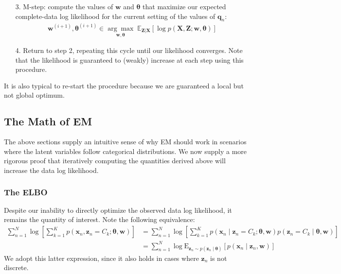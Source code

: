 \begin{itemize}
  \item[3.] M-step: compute the values of $\textbf{w}$ and $\boldsymbol{\theta}$ that maximize our expected complete-data log likelihood for the current setting of the values of $\textbf{q}_n$:
    \begin{align}
        \textbf{w}^{(i + 1)}, \boldsymbol{\theta}^{(i + 1)} \in \underset{\textbf{w}, \boldsymbol{\theta}}{\arg\max} \; \mathbb{E}_{\textbf{Z}|\textbf{X}}[\log p(\textbf{X}, \textbf{Z}; \textbf{w}, \boldsymbol{\theta})]
    \end{align}
    \item[4.] Return to step 2, repeating this cycle until our likelihood converges. Note that the likelihood is guaranteed to (weakly) increase at each step using this procedure.
    \end{itemize}

It is also typical to re-start the procedure because we are guaranteed a local but not global optimum.

\subsection{The Math of EM}

The above sections supply an intuitive sense of why EM should work in scenarios where the latent variables follow categorical distributions. We now supply a more rigorous proof that iteratively computing the quantities derived above will increase the data log likelihood.

\subsubsection{The ELBO}

Despite our inability to directly optimize the observed data log likelihood, it remains the quantity of interest. Note the following equivalence: 
\begin{align}
    \sum_{n = 1} ^N \log \left[\sum_{k = 1} ^K p(\mathbf{x}_n, \mathbf{z}_n = C_k; \boldsymbol\theta, \mathbf{w})\right] &= \sum_{n = 1} ^N \log \left[ \sum_{k = 1} ^K p(\mathbf{x}_n \mid \mathbf{z}_n = C_k; \boldsymbol\theta, \mathbf{w}) p(\mathbf{z}_n = C_k \mid \boldsymbol\theta, \mathbf{w} )\right] \\
    &= \sum_{n = 1} ^N \log \mathrm{E}_{\mathbf{z}_n \sim p(\mathbf{z}_n \mid \boldsymbol{\theta})} \left[ p(\mathbf{x}_n \mid \mathbf{z}_n, \mathbf{w})\right] \label{eq:expectation-log-likelihood}
\end{align}
We adopt this latter expression, since it also holds in cases where $\mathbf{z}_n$ is not discrete. 


